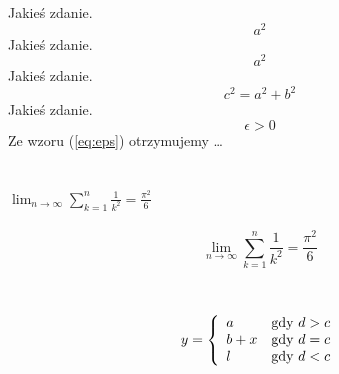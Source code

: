 \documentclass[12pt,twoside,a4paper,twocolumn]{article}
\begin{document}
\newpage
Jakieś zdanie.
$$ a^{2} $$ 
Jakieś zdanie.
\[ a^{2} \]
Jakieś zdanie.
\begin{displaymath}
c^{2}=a^{2}+b^{2}
\end{displaymath}
Jakieś zdanie.
\begin{equation}
\epsilon > 0 \label{eq:eps}
\end{equation}
Ze wzoru (\ref{eq:eps}) otrzymujemy \ldots\\
\\
\\

$\lim_{n \to \infty}
\sum_{k=1}^n \frac{1}{k^2}
= \frac{\pi^2}{6}$
\\ \\
$$
\lim_{n \to \infty}
\sum_{k=1}^n \frac{1}{k^2}
= \frac{\pi^2}{6}
$$
\\
\\
$$
y = \left\{ \begin{array}{ll}
a & \textrm{gdy $d>c$}\\
b+x & \textrm{gdy $d=c$}\\
l & \textrm{gdy $ d < c $}
\end{array} \right.
$$
\end{document}
